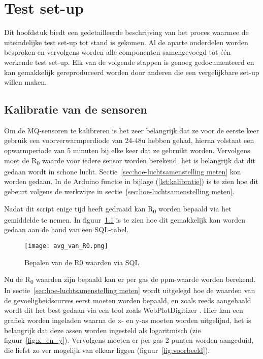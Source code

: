 
\chapter{Test set-up}%
\label{ch:test_setup}

Dit hoofdstuk biedt een gedetailleerde beschrijving van het proces waarmee de uiteindelijke test set-up tot stand is gekomen. Al de aparte onderdelen worden besproken en vervolgens worden alle componenten samengevoegd tot één werkende test set-up. Elk van de volgende stappen is genoeg gedocumenteerd en kan gemakkelijk gereproduceerd worden door anderen die een vergelijkbare set-up willen maken.

\section{Kalibratie van de sensoren}%
\label{sec:kalibratie}

Om de MQ-sensoren te kalibreren is het zeer belangrijk dat ze voor de eerste keer gebruik een voorverwarmperdiode van 24-48u hebben gehad, hierna volstaat een opwarmperiode van 5 minuten bij elke keer dat ze gebruikt worden. Vervolgens moet de R\textsubscript{0} waarde voor iedere sensor worden berekend, het is belangrijk dat dit gedaan wordt in schone lucht. Sectie~\ref{sec:hoe-luchtsamenstelling meten} kon worden gedaan. In de Arduino functie in bijlage (\ref{lst:kalibratie}) is te zien hoe dit gebeurt volgens de werkwijze in sectie~\ref{sec:hoe-luchtsamenstelling meten}.

Nadat dit script enige tijd heeft gedraaid kan R\textsubscript{0} worden bepaald via het gemiddelde te nemen. In figuur~\ref{fig:avg_van_R0} is te zien hoe dit gemakkelijk kan worden gedaan aan de hand van een SQL-tabel.

\begin{figure}[h]
    \texttt{[image: avg\_van\_R0.png]}
    \caption[R0 waarden in SQL]{Bepalen van de R0 waarden via SQL}
    \label{fig:avg_van_R0}
\end{figure}

Nu de R\textsubscript{0} waarden zijn bepaald kan er per gas de ppm-waarde worden berekend. In sectie~\ref{sec:hoe-luchtsamenstelling meten} wordt uitgelegd hoe de waarden van de gevoeligheidscurves eerst moeten worden bepaald, en zoals reeds aangehaald wordt dit het best gedaan via een tool zoals WebPlotDigitizer \autocite{Rohatgi2024}. Hier kan een grafiek worden ingeladen waarna de x- en y-as moeten worden uitgelijnd, het is belangrijk dat deze assen worden ingesteld als logaritmisch (zie figuur~\ref{fig:x_en_y}). Vervolgens moeten er per gas 2 punten worden aangeduid, die liefst zo ver mogelijk van elkaar liggen (figuur~\ref{fig:voorbeeld}).

